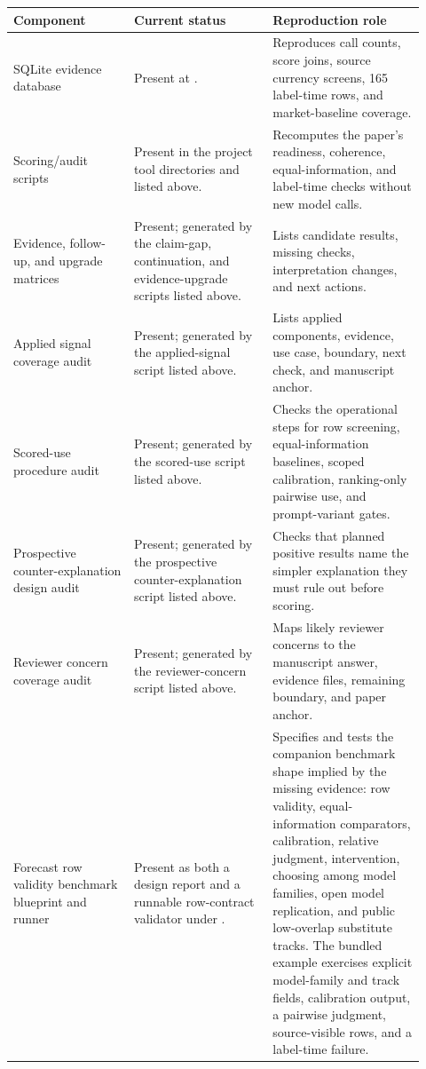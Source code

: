 \documentclass[11pt]{article}
\begin{document}
\begin{table}[p]
\centering
\begingroup
\setlength{\tabcolsep}{2.5pt}
\renewcommand{\arraystretch}{0.86}
\tiny
\setlength{\abovecaptionskip}{3pt}
\setlength{\belowcaptionskip}{0pt}
\begin{tabular}{L{0.27\linewidth} L{0.31\linewidth} L{0.34\linewidth}}
\toprule
Component & Current status & Reproduction role \\
\midrule
SQLite evidence database & Present at . & Reproduces call counts, score joins, source currency screens, 165 label-time rows, and market-baseline coverage. \\
Scoring/audit scripts & Present in the project tool directories and listed above. & Recomputes the paper's readiness, coherence, equal-information, and label-time checks without new model calls. \\
Evidence, follow-up, and upgrade matrices & Present; generated by the claim-gap, continuation, and evidence-upgrade scripts listed above. & Lists candidate results, missing checks, interpretation changes, and next actions. \\
Applied signal coverage audit & Present; generated by the applied-signal script listed above. & Lists applied components, evidence, use case, boundary, next check, and manuscript anchor. \\
Scored-use procedure audit & Present; generated by the scored-use script listed above. & Checks the operational steps for row screening, equal-information baselines, scoped calibration, ranking-only pairwise use, and prompt-variant gates. \\
Prospective counter-explanation design audit & Present; generated by the prospective counter-explanation script listed above. & Checks that planned positive results name the simpler explanation they must rule out before scoring. \\
Reviewer concern coverage audit & Present; generated by the reviewer-concern script listed above. & Maps likely reviewer concerns to the manuscript answer, evidence files, remaining boundary, and paper anchor. \\
Forecast row validity benchmark blueprint and runner & Present as both a design report and a runnable row-contract validator under . & Specifies and tests the companion benchmark shape implied by the missing evidence: row validity, equal-information comparators, calibration, relative judgment, intervention, choosing among model families, open model replication, and public low-overlap substitute tracks. The bundled example exercises explicit model-family and track fields, calibration output, a pairwise judgment, source-visible rows, and a label-time failure. \\

\end{tabular}
\end{table}
\end{document}
